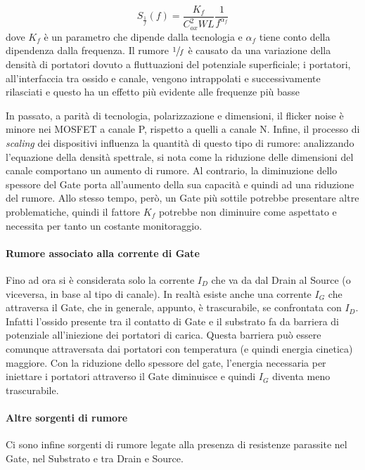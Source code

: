 \begin{equation}
  S_{\frac{1}{f}} \left(f\right) = \frac{K_f}{C_{ox}^2 W L} \frac{1}{f^{\alpha_f}}
\end{equation}
dove $K_f$ è un parametro che dipende dalla tecnologia e $\alpha_f$ tiene conto della dipendenza dalla frequenza.
Il rumore $\sfrac{1}{f}$ è causato da una variazione della densità di portatori dovuto a fluttuazioni del potenziale superficiale; i portatori, all'interfaccia tra ossido e canale, vengono intrappolati e successivamente rilasciati e questo ha un effetto più evidente alle frequenze più basse

In passato, a parità di tecnologia, polarizzazione e dimensioni, il flicker noise è minore nei MOSFET a canale P, rispetto a quelli a canale N. Infine, il processo di \emph{scaling} dei dispositivi influenza la quantità di questo tipo di rumore: analizzando l'equazione della densità spettrale, si nota come la riduzione delle dimensioni del canale comportano un aumento di rumore. Al contrario, la diminuzione dello spessore del Gate porta all'aumento della sua capacità e quindi ad una riduzione del rumore. Allo stesso tempo, però, un Gate più sottile potrebbe presentare altre problematiche, quindi il fattore $K_f$ potrebbe non diminuire come aspettato e necessita per tanto un costante monitoraggio. 

\paragraph*{Rumore associato alla corrente di Gate}
Fino ad ora si è considerata solo la corrente $I_D$ che va da dal Drain al Source (o viceversa, in base al tipo di canale). In realtà esiste anche una corrente $I_G$ che attraversa il Gate, che in generale, appunto, è trascurabile, se confrontata con  $I_D$. Infatti l'ossido presente tra il contatto di Gate e il substrato fa da barriera di potenziale all'iniezione dei portatori di carica. Questa barriera può essere comunque attraversata dai portatori con temperatura (e quindi energia cinetica) maggiore. Con la riduzione dello spessore del gate, l'energia necessaria per iniettare i portatori attraverso il Gate diminuisce e quindi $I_G$ diventa meno trascurabile.

\paragraph*{Altre sorgenti di rumore}
Ci sono infine sorgenti di rumore legate alla presenza di resistenze parassite nel Gate, nel Substrato e tra Drain e Source.